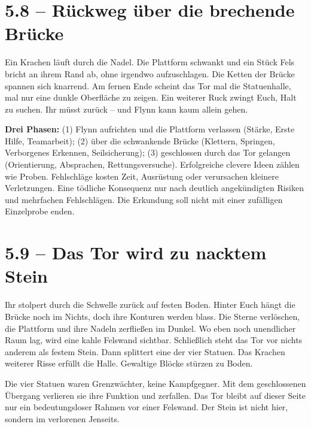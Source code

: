 \section{5.8 -- Rückweg über die brechende Brücke}
\begin{vorlesetextalle}
Ein Krachen läuft durch die Nadel. Die Plattform schwankt und ein Stück Fels bricht an ihrem Rand ab, ohne irgendwo aufzuschlagen. Die Ketten der Brücke spannen sich knarrend. Am fernen Ende scheint das Tor mal die Statuenhalle, mal nur eine dunkle Oberfläche zu zeigen. Ein weiterer Ruck zwingt Euch, Halt zu suchen. Ihr müsst zurück -- und Flynn kann kaum allein gehen.
\end{vorlesetextalle}
\begin{meisterinfo}
\textbf{Drei Phasen:} (1) Flynn aufrichten und die Plattform verlassen (Stärke, Erste Hilfe, Teamarbeit); (2) über die schwankende Brücke (Klettern, Springen, Verborgenes Erkennen, Seilsicherung); (3) geschlossen durch das Tor gelangen (Orientierung, Absprachen, Rettungsversuche). Erfolgreiche clevere Ideen zählen wie Proben. Fehlschläge kosten Zeit, Ausrüstung oder verursachen kleinere Verletzungen. Eine tödliche Konsequenz nur nach deutlich angekündigten Risiken und mehrfachen Fehlschlägen. Die Erkundung soll nicht mit einer zufälligen Einzelprobe enden.
\end{meisterinfo}

\section{5.9 -- Das Tor wird zu nacktem Stein}
\begin{vorlesetextalle}
Ihr stolpert durch die Schwelle zurück auf festen Boden. Hinter Euch hängt die Brücke noch im Nichts, doch ihre Konturen werden blass. Die Sterne verlöschen, die Plattform und ihre Nadeln zerflie\ss{}en im Dunkel. Wo eben noch unendlicher Raum lag, wird eine kahle Felswand sichtbar. Schlie\ss{}lich steht das Tor vor nichts anderem als festem Stein. Dann splittert eine der vier Statuen. Das Krachen weiterer Risse erfüllt die Halle. Gewaltige Blöcke stürzen zu Boden.
\end{vorlesetextalle}
\begin{meisterinfo}
Die vier Statuen waren Grenzwächter, keine Kampfgegner. Mit dem geschlossenen Übergang verlieren sie ihre Funktion und zerfallen. Das Tor bleibt auf dieser Seite nur ein bedeutungsloser Rahmen vor einer Felswand. Der Stein ist nicht hier, sondern im verlorenen Jenseits.
\end{meisterinfo}

